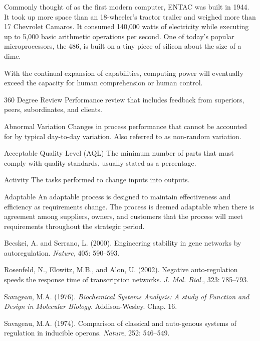 \begin{VT1}


Commonly thought of as the first modern computer, ENTAC was built in 1944. It took up more space than an 18-wheeler's
tractor trailer and weighed more than 17 Chevrolet Camaros. It consumed 140,000 watts of electricity while executing
up to 5,000 basic arithmetic operations per second. One of today's popular microprocessors, the 486, is built on a
tiny piece of silicon about the size of a dime.

\VT
With the continual expansion of capabilities, computing power will eventually exceed the capacity for human
comprehension or human control.

\end{VT1}



\begin{Glossary}
\item[360 Degree Review] Performance review that includes feedback from superiors, peers, subordinates, and clients.
\item[Abnormal Variation] Changes in process performance that cannot be accounted for by typical day-to-day variation. Also referred to as
non-random variation.
\item[Acceptable Quality Level (AQL)] The minimum number of parts that must comply with quality standards, usually stated as a percentage.
\item[Activity] The tasks performed to change inputs into outputs.
\item[Adaptable] An adaptable process is designed to maintain effectiveness and efficiency as requirements change. The process is
deemed adaptable when there is agreement among suppliers, owners, and customers that the process will meet
requirements throughout the strategic period.
\end{Glossary}


\begin{thefurtherreading}{99}

\bibitem{} Becskei, A. and Serrano, L. (2000). Engineering stability in gene networks 
by autoregulation. \textit{Nature, }405: 590--593.

\bibitem{} Rosenfeld, N., Elowitz, M.B., and Alon, U. (2002). Negative auto-regulation 
speeds the response time of transcription networks. \textit{J. Mol. Biol.}, 323: 785--793.

\bibitem{} Savageau, M.A. (1976). \textit{Biochemical Systems Analysis: A study of Function and Design in Molecular Biology. }Addison-Wesley. Chap. 16.

\bibitem{} Savageau, M.A. (1974). Comparison of classical and auto-genous systems of 
regulation in inducible operons. \textit{Nature}, 252: 546--549.
\end{thefurtherreading}